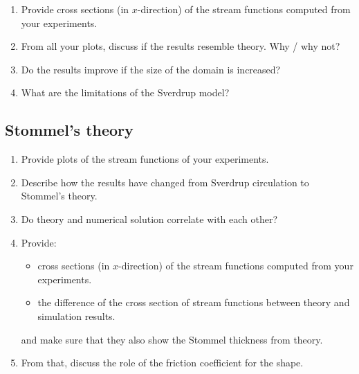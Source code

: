 \begin{question}
\begin{enumerate}
\item Provide cross sections (in $x$-direction) of the stream functions computed from your experiments. 

\item From all your plots, discuss if the results resemble theory. Why / why not? 

\item Do the results improve if the size of the domain is increased? 

\item What are the limitations of the Sverdrup model? 
\end{enumerate}

\subsection*{Stommel’s theory}

\begin{enumerate}
\item Provide plots of the stream functions of your experiments. 

\item Describe how the results have changed from Sverdrup circulation to Stommel’s theory. 

\item Do theory and numerical solution correlate with each other? 

\item Provide:
\begin{itemize}
\item cross sections (in $x$-direction) of the stream functions computed from your experiments. 
\item the difference of the cross section of stream functions between theory and simulation results. 
\end{itemize}
and make sure that they also show the Stommel thickness from theory. 

\item From that, discuss the role of the friction coefficient for the shape. 
\end{enumerate}
\end{question}